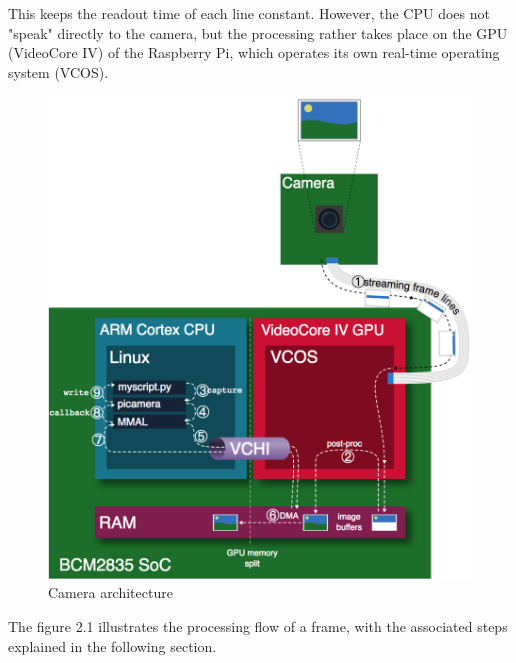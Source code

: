 \documentclass[12pt, a4paper]{report}
\begin{document}
    This keeps the readout time of each line constant. However, the CPU does not "speak" directly to the camera, but the processing rather takes place on the GPU (VideoCore IV) of the Raspberry Pi, which operates its own real-time operating system (VCOS).
    
    \bigskip
    \noindent
    \begin{figure}[H]
    \centering
    \includegraphics[scale=0.7]{Images/camera_architecture.png}
    
    \caption{Camera architecture \cite{ReadTheDocsPicamera}}
    \end{figure}
    \bigskip
    
    The figure 2.1 illustrates the processing flow of a frame, with the associated steps explained in the following section.
    
\end{document}
